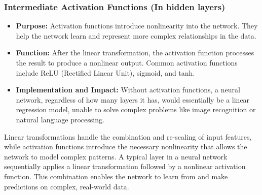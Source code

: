 \documentclass{article}
\begin{document}
\subsubsection{Intermediate Activation Functions (In hidden layers)}
\begin{itemize}
    \item \textbf{Purpose:} Activation functions introduce nonlinearity into the network. They help the network learn and represent more complex relationships in the data.
    \item \textbf{Function:} After the linear transformation, the activation function processes the result to produce a nonlinear output. Common activation functions include ReLU (Rectified Linear Unit), sigmoid, and tanh.
    \item \textbf{Implementation and Impact:} Without activation functions, a neural network, regardless of how many layers it has, would essentially be a linear regression model, unable to solve complex problems like image recognition or natural language processing.
\end{itemize}

Linear transformations handle the combination and re-scaling of input features, while activation functions introduce the necessary nonlinearity that allows the network to model complex patterns. A typical layer in a neural network sequentially applies a linear transformation followed by a nonlinear activation function. This combination enables the network to learn from and make predictions on complex, real-world data.
\end{document}
